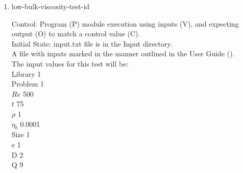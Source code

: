 \documentclass[12pt, titlepage]{article}
\newcommand{\famname}{Lattice Boltzmann Solver}
\newcounter{testcounter} %
\begin{document}
\begin{enumerate}
Output: Vorticity vector values printed to the screen. \\

Test Case Derivation: This case is a comparison with the pseudo-oracle
pyLBM. The C values of this test for pyLBM can be found in the file
id8output.txt located in the OracleOutput folder. The output values of {\famname} will be compared to the pseudo-oracle output values.\\

This test covers the high bound for density using a density close to that of mercury.\\
					
How test will be performed: 

\begin{enumerate}
\item The Von Karman Vortex Street module shall be modified by the author to
  print the vorticity vector as output.
\item Outside of the system, the input parameter values will be written to a text file titled input.txt, as outlined in Section \ref{ext4-inputs} of the User Guide.
\item The file will be placed into the Input directory, under the home directory of the project.
\item {\famname} shall be run.
\item Upon completion of the module, the output values of the vorticity vector
  will be compared to the vorticity vector values from pyLBM - comparison will
  be done per cell. Comparisons can be done manually using Excel, or through a
  script, using the equation for relative error found in Section \ref{eqerror}.
\end{enumerate}

\item{low-bulk-viscosity-test-id\thetestcounter \\}

Control: Program (P) module execution using inputs (V), and expecting output (O) to match a control value (C).\\
					
Initial State: input.txt file is in the Input directory.\\
					
A file with inputs marked in the manner outlined in the User
Guide (\citet{LBM_UserGuide_PM}).\\The input values for this test will be:\\
  Library 1\\
Problem 1\\
$Re$ 500\\
$t$ 75\\
$\rho$ 1\\
$\eta_b$ 0.0001\\
Size 1\\
$\mathrm{e}$ 1\\
$\mathrm{D}$ 2\\
$\mathrm{Q}$ 9\\


\end{enumerate}
\end{document}
